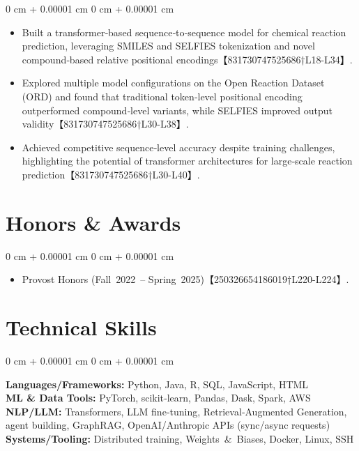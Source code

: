 \documentclass[10pt, letterpaper]{article}
\newenvironment{highlights}{
    \begin{itemize}[
        topsep=0.10 cm,
        parsep=0.10 cm,
        partopsep=0pt,
        itemsep=0pt,
        leftmargin=0 cm + 10pt
    ]
}{
    \end{itemize}
} %
\newenvironment{onecolentry}{
    \begin{adjustwidth}{
        0 cm + 0.00001 cm
    }{
        0 cm + 0.00001 cm
    }
}{
    \end{adjustwidth}
} %
\begin{document}
    \vspace{0.10 cm}
    \begin{onecolentry}
        \begin{highlights}
            \item Built a transformer‑based sequence‑to‑sequence model for chemical reaction prediction, leveraging SMILES and SELFIES tokenization and novel compound‑based relative positional encodings【831730747525686†L18-L34】.
            \item Explored multiple model configurations on the Open Reaction Dataset (ORD) and found that traditional token‑level positional encoding outperformed compound‑level variants, while SELFIES improved output validity【831730747525686†L30-L38】.
            \item Achieved competitive sequence‑level accuracy despite training challenges, highlighting the potential of transformer architectures for large‑scale reaction prediction【831730747525686†L30-L40】.
        \end{highlights}
    \end{onecolentry}

    \section{Honors \& Awards}

    \begin{onecolentry}
        \begin{highlights}
            \item Provost Honors (Fall 2022 – Spring 2025)【250326654186019†L220-L224】.
        \end{highlights}
    \end{onecolentry}

    \section{Technical Skills}

    \begin{onecolentry}
        \textbf{Languages/Frameworks:} Python, Java, R, SQL, JavaScript, HTML \\
        \textbf{ML \& Data Tools:} PyTorch, scikit‑learn, Pandas, Dask, Spark, AWS \\
        \textbf{NLP/LLM:} Transformers, LLM fine‑tuning, Retrieval‑Augmented Generation, agent building, GraphRAG, OpenAI/Anthropic APIs (sync/async requests) \\
        \textbf{Systems/Tooling:} Distributed training, Weights \& Biases, Docker, Linux, SSH
    \end{onecolentry}
\end{document}
